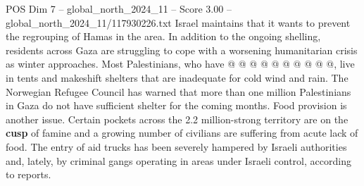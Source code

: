 \begin{textsample}{POS Dim 7 – global\_north\_2024\_11 – Score 3.00 – global\_north\_2024\_11/117930226.txt}
Israel maintains that it wants to prevent the regrouping of Hamas in the area.
In addition to the ongoing shelling, residents across Gaza are struggling to cope with a worsening humanitarian crisis as winter approaches.
Most Palestinians, who have @ @ @ @ @ @ @ @ @ @, live in tents and makeshift shelters that are inadequate for cold wind and rain.
The Norwegian Refugee Council has warned that more than one million Palestinians in Gaza do not have sufficient shelter for the coming months.
Food provision is another issue.
Certain pockets across the 2.2 million-strong territory are on the \textbf{cusp} of famine and a growing number of civilians are suffering from acute lack of food.
The entry of aid trucks has been severely hampered by Israeli authorities and, lately, by criminal gangs operating in areas under Israeli control, according to reports.

\end{textsample}
